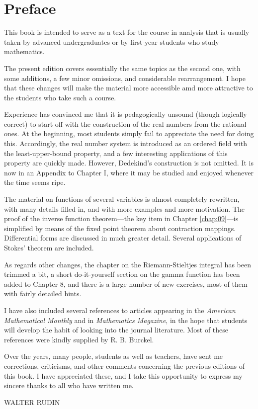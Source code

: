 \chapter*{Preface}
\label{chap:00}
This book is intended to serve as a text for the course in analysis that is usually
taken by advanced undergraduates or by first-year students who study mathematics.

The present edition covers essentially the same topics as the second one,
with some additions, a few minor omissions, and considerable rearrangement. I hope that these changes will make the material more accessible amd more attractive to the students who take such a course.

Experience has convinced me that it is pedagogically unsound (though
logically correct) to start off with the construction of the real numbers from the
rational ones. At the beginning, most students simply fail to appreciate the need
for doing this. Accordingly, the real number system is introduced as an ordered
field with the least-upper-bound property, and a few interesting applications of
this property are quickly made. However, Dedekind's construction is not omitted. It is now in an Appendix to Chapter I, where it may be studied and enjoyed
whenever the time seems ripe.

The material on functions of several variables is almost completely rewritten, with many details filled in, and with more examples and more motivation. The proof of the inverse function theorem---the key item in Chapter \ref{chap:09}---is
simplified by means of the fixed point theorem about contraction mappings.
Differential forms are discussed in much greater detail. Several applications of
Stokes' theorem are included.

As regards other changes, the chapter on the Riemann-Stieltjes integral
has been trimmed a bit, a short do-it-yourself section on the gamma function
has been added to Chapter 8, and there is a large number of new exercises, most
of them with fairly detailed hints.

I have also included several references to articles appearing in the \emph{American Mathematical Monthly} and in \emph{Mathematics Magazine}, in the hope that students
will develop the habit of looking into the journal literature. Most of these
references were kindly supplied by R. B. Burckel.

Over the years, many people, students as well as teachers, have sent me
corrections, criticisms, and other comments concerning the previous editions
of this book. I have appreciated these, and I take this opportunity to express
my sincere thanks to all who have written me.


WALTER RUDIN
